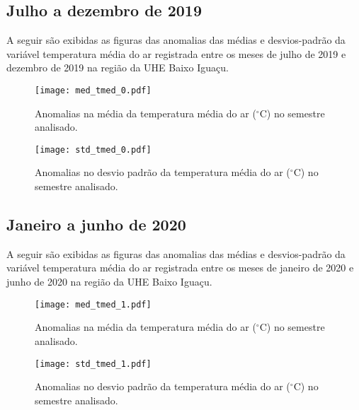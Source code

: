\documentclass[a4paper,12pt]{article}
\begin{document}
        \subsection{Julho a dezembro de 2019}
        \hspace{0.5cm} A seguir são exibidas as figuras das anomalias das médias e desvios-padrão da variável temperatura média do ar
        registrada entre os meses de julho de 2019 e dezembro de 2019 na região da UHE Baixo Iguaçu.

        \begin{figure}[!htb]
        \centering
        \texttt{[image: med\_tmed\_0.pdf]}
        \caption{Anomalias na média da temperatura média do ar ($^\circ$C) no semestre analisado.}
        \label{fig:figmed_tmed_0}
        \end{figure}

        \begin{figure}[!htb]
        \centering
        \texttt{[image: std\_tmed\_0.pdf]}
        \caption{Anomalias no desvio padrão da temperatura média do ar ($^\circ$C) no semestre analisado.}
        \label{fig:figstd_tmed_0}
        \end{figure}

        \newpage
        \subsection{Janeiro a junho de 2020}
        \hspace{0.5cm} A seguir são exibidas as figuras das anomalias das médias e desvios-padrão da variável temperatura média do ar
        registrada entre os meses de janeiro de 2020 e junho de 2020 na região da UHE Baixo Iguaçu.

        \begin{figure}[!htb]
        \centering
        \texttt{[image: med\_tmed\_1.pdf]}
        \caption{Anomalias na média da temperatura média do ar ($^\circ$C) no semestre analisado.}
        \label{fig:figmed_tmed_1}
        \end{figure}

        \begin{figure}[!htb]
        \centering
        \texttt{[image: std\_tmed\_1.pdf]}
        \caption{Anomalias no desvio padrão da temperatura média do ar ($^\circ$C) no semestre analisado.}
        \label{fig:figstd_tmed_1}
        \end{figure}
\end{document}
